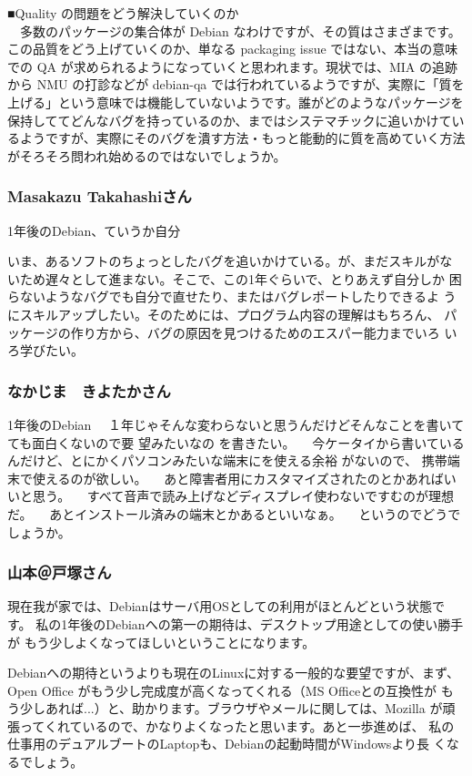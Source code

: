 \documentclass[mingoth]{jsarticle}
\begin{document}
■Quality の問題をどう解決していくのか\\
　多数のパッケージの集合体が Debian なわけですが、その質はさまざまです。この品質をどう上げていくのか、単なる packaging issue ではない、本当の意味での QA が求められるようになっていくと思われます。現状では、MIA の追跡から NMU の打診などが debian-qa では行われているようですが、実際に「質を上げる」という意味では機能していないようです。誰がどのようなパッケージを保持しててどんなバグを持っているのか、まではシステマチックに追いかけているようですが、実際にそのバグを潰す方法・もっと能動的に質を高めていく方法がそろそろ問われ始めるのではないでしょうか。


\subsubsection{Masakazu Takahashiさん}
1年後のDebian、ていうか自分

いま、あるソフトのちょっとしたバグを追いかけている。が、まだスキルがな
いため遅々として進まない。そこで、この1年ぐらいで、とりあえず自分しか
困らないようなバグでも自分で直せたり、またはバグレポートしたりできるよ
うにスキルアップしたい。そのためには、プログラム内容の理解はもちろん、
パッケージの作り方から、バグの原因を見つけるためのエスパー能力までいろ
いろ学びたい。

\subsubsection{なかじま　きよたかさん}

1年後のDebian	
　１年じゃそんな変わらないと思うんだけどそんなことを書いてても面白くないので要
望みたいなの
を書きたい。
　今ケータイから書いているんだけど、とにかくパソコンみたいな端末にを使える余裕
がないので、
携帯端末で使えるのが欲しい。
　あと障害者用にカスタマイズされたのとかあればいいと思う。
　すべて音声で読み上げなどディスプレイ使わないですむのが理想だ。
　あとインストール済みの端末とかあるといいなぁ。
　というのでどうでしょうか。

\subsubsection{山本＠戸塚さん}


現在我が家では、Debianはサーバ用OSとしての利用がほとんどという状態です。
私の1年後のDebianへの第一の期待は、デスクトップ用途としての使い勝手が
もう少しよくなってほしいということになります。

Debianへの期待というよりも現在のLinuxに対する一般的な要望ですが、まず、
Open Office がもう少し完成度が高くなってくれる（MS Officeとの互換性が
もう少しあれば...）と、助かります。ブラウザやメールに関しては、Mozilla 
が頑張ってくれているので、かなりよくなったと思います。あと一歩進めば、
私の仕事用のデュアルブートのLaptopも、Debianの起動時間がWindowsより長
くなるでしょう。
\end{document}
